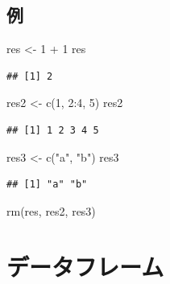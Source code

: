 \documentclass[
  xelatex,ja=standard, b5paper]{bxjsbook}
\newenvironment{Shaded}{\begin{snugshade}}{\end{snugshade}}
\newcommand{\DecValTok}[1]{\textcolor[rgb]{0.00,0.00,0.81}{#1}}
\newcommand{\FunctionTok}[1]{\textcolor[rgb]{0.00,0.00,0.00}{#1}}
\newcommand{\NormalTok}[1]{#1}
\newcommand{\OtherTok}[1]{\textcolor[rgb]{0.56,0.35,0.01}{#1}}
\newcommand{\SpecialCharTok}[1]{\textcolor[rgb]{0.00,0.00,0.00}{#1}}
\newcommand{\StringTok}[1]{\textcolor[rgb]{0.31,0.60,0.02}{#1}}
\begin{document}
\hypertarget{p-object-ex}{%
\subsection{例}\label{p-object-ex}}

\begin{Shaded}
\begin{Highlighting}[]
\NormalTok{res }\OtherTok{\textless{}{-}} \DecValTok{1} \SpecialCharTok{+} \DecValTok{1}
\NormalTok{res}
\end{Highlighting}
\end{Shaded}

\begin{verbatim}
## [1] 2
\end{verbatim}

\begin{Shaded}
\begin{Highlighting}[]
\NormalTok{res2 }\OtherTok{\textless{}{-}} \FunctionTok{c}\NormalTok{(}\DecValTok{1}\NormalTok{, }\DecValTok{2}\SpecialCharTok{:}\DecValTok{4}\NormalTok{, }\DecValTok{5}\NormalTok{)}
\NormalTok{res2}
\end{Highlighting}
\end{Shaded}

\begin{verbatim}
## [1] 1 2 3 4 5
\end{verbatim}

\begin{Shaded}
\begin{Highlighting}[]
\NormalTok{res3 }\OtherTok{\textless{}{-}} \FunctionTok{c}\NormalTok{(}\StringTok{"a"}\NormalTok{, }\StringTok{"b"}\NormalTok{)}
\NormalTok{res3}
\end{Highlighting}
\end{Shaded}

\begin{verbatim}
## [1] "a" "b"
\end{verbatim}

\begin{Shaded}
\begin{Highlighting}[]
\FunctionTok{rm}\NormalTok{(res, res2, res3)}
\end{Highlighting}
\end{Shaded}

\hypertarget{p-df}{%
\section{データフレーム}\label{p-df}}
\end{document}
